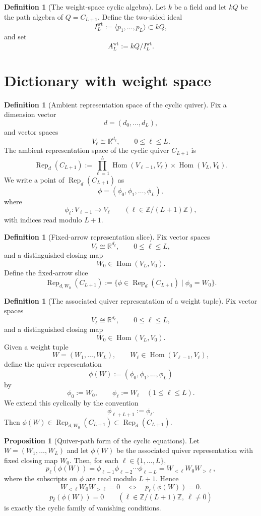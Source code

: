 \documentclass{article}
\newcommand{\R}{\mathbb{R}}
\newcommand{\Hom}{\operatorname{Hom}}
\newcommand{\Rep}{\operatorname{Rep}}
\theoremstyle{definition}
\newtheorem{proposition}[theorem]{Proposition}
\newtheorem{definition}[theorem]{Definition}
\begin{document}
\begin{definition}[The weight-space cyclic algebra]
Let $k$ be a field and let $kQ$ be the path algebra of $Q=C_{L+1}$.
Define the two-sided ideal
\[
I_L^{\mathrm{wt}}
:=
\langle p_1,\dots,p_L\rangle
\subset kQ,
\]
and set
\[
A_L^{\mathrm{wt}}
:=
kQ/I_L^{\mathrm{wt}}.
\]
\end{definition}

\section{Dictionary with weight space}

\begin{definition}[Ambient representation space of the cyclic quiver]
Fix a dimension vector
\[
d=(d_0,\dots,d_L),
\]
and vector spaces
\[
V_\ell\cong \R^{d_\ell},
\qquad
0\le \ell\le L.
\]
The ambient representation space of the cyclic quiver $C_{L+1}$ is
\[
\Rep_d(C_{L+1})
:=
\prod_{\ell=1}^L \Hom(V_{\ell-1},V_\ell)\times \Hom(V_L,V_0).
\]
We write a point of $\Rep_d(C_{L+1})$ as
\[
\phi=(\phi_0,\phi_1,\dots,\phi_L),
\]
where
\[
\phi_\ell:V_{\ell-1}\to V_\ell
\qquad
(\ell\in \mathbb Z/(L+1)\mathbb Z),
\]
with indices read modulo $L+1$.
\end{definition}

\begin{definition}[Fixed-arrow representation slice]
Fix vector spaces
\[
V_\ell\cong \R^{d_\ell},
\qquad
0\le \ell\le L,
\]
and a distinguished closing map
\[
W_0\in \Hom(V_L,V_0).
\]
Define the fixed-arrow slice
\[
\Rep_{d,W_0}(C_{L+1})
:=
\{\phi\in \Rep_d(C_{L+1})\mid \phi_0=W_0\}.
\]
\end{definition}

\begin{definition}[The associated quiver representation of a weight tuple]
Fix vector spaces
\[
V_\ell\cong \R^{d_\ell},
\qquad
0\le \ell\le L,
\]
and a distinguished closing map
\[
W_0\in \Hom(V_L,V_0).
\]
Given a weight tuple
\[
W=(W_1,\dots,W_L),
\qquad
W_\ell\in \Hom(V_{\ell-1},V_\ell),
\]
define the quiver representation
\[
\phi(W):=(\phi_0,\phi_1,\dots,\phi_L)
\]
by
\[
\phi_0:=W_0,
\qquad
\phi_\ell:=W_\ell
\quad
(1\le \ell\le L).
\]
We extend this cyclically by the convention
\[
\phi_{\ell+L+1}:=\phi_\ell.
\]
Then $\phi(W)\in \Rep_{d,W_0}(C_{L+1})\subset \Rep_d(C_{L+1})$.
\end{definition}

\begin{proposition}[Quiver-path form of the cyclic equations]
Let $W=(W_1,\dots,W_L)$ and let $\phi(W)$ be the associated quiver
representation with fixed closing map $W_0$.
Then, for each $\ell\in\{1,\dots,L\}$,
\[
p_\ell(\phi(W))
=
\phi_{\ell-1}\phi_{\ell-2}\cdots \phi_{\ell-L}
=
W_{<\ell}W_0W_{>\ell},
\]
where the subscripts on $\phi$ are read modulo $L+1$. Hence
\[
W_{<\ell}W_0W_{>\ell}=0
\quad\Longleftrightarrow\quad
p_\ell(\phi(W))=0.
\]
\[
p_{\bar\ell}(\phi(W))=0
\qquad
(\bar\ell\in \mathbb Z/(L+1)\mathbb Z,\ \bar\ell\neq \bar 0)
\]
is exactly the cyclic family of vanishing conditions.
\end{proposition}
\end{document}
